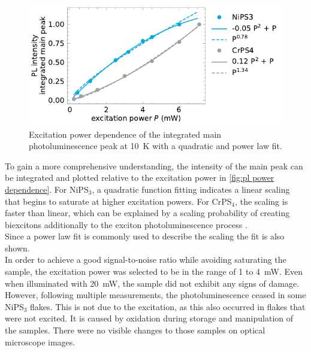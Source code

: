 \documentclass[
	twoside,
	parskip=half,
	a4paper,
]{scrbook}
\begin{document}
\begin{figure}
	\centering
	\includegraphics{../figures/2024-04-19 excitation power dependence of main pl line.pdf}
	\caption{Excitation power dependence of the integrated main photoluminescence peak at \SI{10}{K} with a quadratic and power law fit. }
	\label{fig:pl power dependence}
\end{figure}
To gain a more comprehensive understanding, the intensity of the main peak can be integrated and plotted relative to the excitation power in \autoref{fig:pl power dependence}.
For NiPS$_3$, a quadratic function fitting indicates a linear scaling that begins to saturate at higher excitation powers.
For CrPS$_4$, the scaling is faster than linear, which can be explained by a scaling probability of creating biexcitons additionally to the exciton photoluminescence process \cite{biexciton}. \\
Since a power law fit is commonly used to describe the scaling the fit is also shown.\\
In order to achieve a good signal-to-noise ratio while avoiding saturating the sample, the excitation power was selected to be in the range of \SI{1}{} to \SI{4}{mW}.
Even when illuminated with \SI{20}{mW}, the sample did not exhibit any signs of damage.\\
However, following multiple measurements, the photoluminescence ceased in some NiPS$_3$ flakes.
This is not due to the excitation, as this also occurred in flakes that were not excited.
It is caused by oxidation during storage and manipulation of the samples.
There were no visible changes to those samples on optical microscope images.


\clearpage
\end{document}
